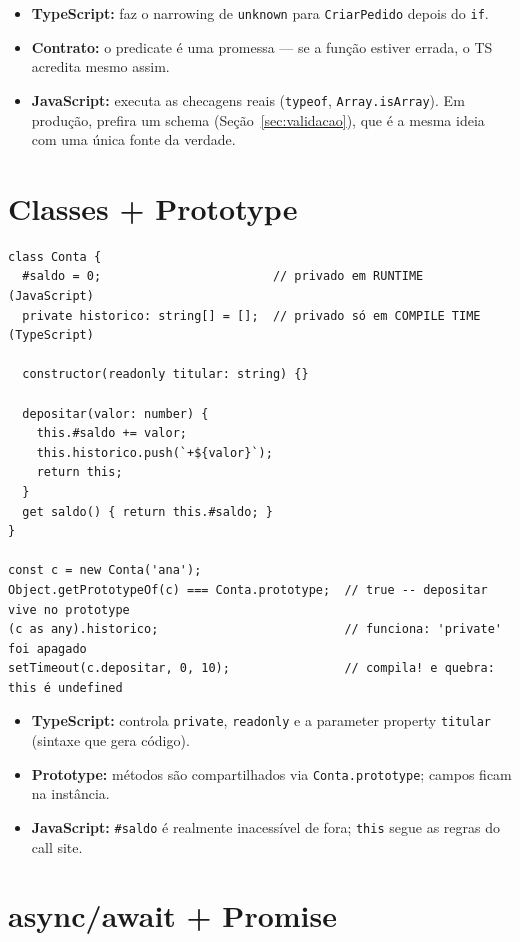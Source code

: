 \documentclass[12pt,a4paper,oneside]{book}
\newcommand{\code}[1]{\texttt{#1}}
\begin{document}
\begin{itemize}
  \item \textbf{TypeScript:} faz o narrowing de \code{unknown} para \code{CriarPedido} depois do \code{if}.
  \item \textbf{Contrato:} o predicate é uma promessa --- se a função estiver errada, o TS acredita mesmo assim.
  \item \textbf{JavaScript:} executa as checagens reais (\code{typeof}, \code{Array.isArray}). Em produção, prefira um schema (Seção~\ref{sec:validacao}), que é a mesma ideia com uma única fonte da verdade.
\end{itemize}

\section{Classes + Prototype}

\begin{verbatim}
class Conta {
  #saldo = 0;                        // privado em RUNTIME (JavaScript)
  private historico: string[] = [];  // privado só em COMPILE TIME (TypeScript)

  constructor(readonly titular: string) {}

  depositar(valor: number) {
    this.#saldo += valor;
    this.historico.push(`+${valor}`);
    return this;
  }
  get saldo() { return this.#saldo; }
}

const c = new Conta('ana');
Object.getPrototypeOf(c) === Conta.prototype;  // true -- depositar vive no prototype
(c as any).historico;                          // funciona: 'private' foi apagado
setTimeout(c.depositar, 0, 10);                // compila! e quebra: this é undefined
\end{verbatim}

\begin{itemize}
  \item \textbf{TypeScript:} controla \code{private}, \code{readonly} e a parameter property \code{titular} (sintaxe que gera código).
  \item \textbf{Prototype:} métodos são compartilhados via \code{Conta.prototype}; campos ficam na instância.
  \item \textbf{JavaScript:} \code{\#saldo} é realmente inacessível de fora; \code{this} segue as regras do call site.
\end{itemize}

\section{async/await + Promise}
\end{document}

